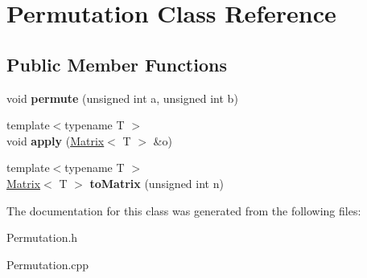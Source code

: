 \hypertarget{class_permutation}{}\section{Permutation Class Reference}
\label{class_permutation}
\subsection*{Public Member Functions}
\begin{DoxyCompactItemize}
\item 
\mbox{\label{class_permutation_a4903303ee7dcfd9720c884658d0584f4}} 
void {\bfseries permute} (unsigned int a, unsigned int b)
\item 
\mbox{\label{class_permutation_afdbb90d7aef515f8bf3b8863e1873430}} 
{\footnotesize template$<$typename T $>$ }\\void {\bfseries apply} (\mbox{\hyperlink{class_matrix}{Matrix}}$<$ T $>$ \&o)
\item 
\mbox{\label{class_permutation_a354d3f6bdbaadc68d7335ec82781a2b3}} 
{\footnotesize template$<$typename T $>$ }\\\mbox{\hyperlink{class_matrix}{Matrix}}$<$ T $>$ {\bfseries to\+Matrix} (unsigned int n)
\end{DoxyCompactItemize}


The documentation for this class was generated from the following files\+:\begin{DoxyCompactItemize}
\item 
Permutation.\+h\item 
Permutation.\+cpp\end{DoxyCompactItemize}

